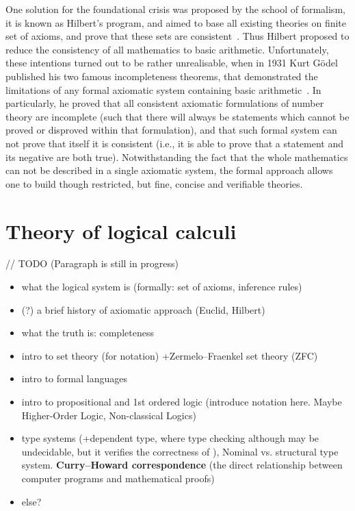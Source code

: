 \documentclass[article]{aaltoseries}
\begin{document}
One solution for the foundational crisis was proposed by the school of formalism, it is known as Hilbert's program, and aimed to base all existing theories on finite set of axioms, and prove that these sets are consistent~\cite{Zac06}. Thus Hilbert proposed to reduce the consistency of all mathematics to basic arithmetic. 
Unfortunately, these intentions turned out to be rather unrealisable, when in 1931 Kurt Gödel published his two famous incompleteness theorems, that demonstrated the limitations of any formal axiomatic system containing basic arithmetic~\cite{Raa15}. In particularly, he proved that all consistent axiomatic formulations of number theory are incomplete (such that there will always be statements which cannot be proved or disproved within that formulation), and that such formal system can not prove that itself it is consistent (i.e., it is able to prove that a statement and its negative are both true).
Notwithstanding the fact that the whole mathematics can not be described in a single axiomatic system, the formal approach allows one to build though restricted, but fine, concise and verifiable theories.


\section{Theory of logical calculi}
\label{sec:formal_theory}

// TODO (Paragraph is still in progress)

\begin{itemize}
\itemsep0em
	\item what the logical system is (formally: set of axioms, inference rules)
	\item (?) a brief history of axiomatic approach (Euclid, Hilbert)
	\item what the truth is: completeness
	\item intro to set theory (for notation) +Zermelo–Fraenkel set theory (ZFC)
	\item intro to formal languages
	\item intro to propositional and 1st ordered logic (introduce notation here. Maybe Higher-Order Logic, Non-classical Logics)
	\item type systems (+dependent type, where type checking although may be undecidable, but it verifies the correctness of ), Nominal vs. structural type system. \textbf{Curry–Howard correspondence} (the direct relationship between computer programs and mathematical proofs)
	\item else?
\end{itemize}
\end{document}

